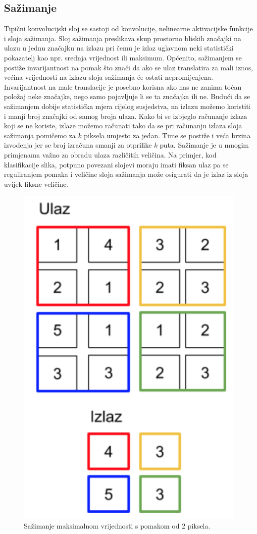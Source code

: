 \subsection{Sažimanje}
Tipični konvolucijski sloj se sastoji od konvolucije, nelinearne aktivacijske funkcije i sloja sažimanja. Sloj sažimanja preslikava skup prostorno bliskih značajki na ulazu u jednu značajku na izlazu pri čemu je izlaz uglavnom neki statistički pokazatelj kao npr. srednja vrijednost ili maksimum. Općenito, sažimanjem se postiže invarijantnost na pomak što znači da ako se ulaz translatira za mali iznos, većina vrijednosti na izlazu sloja sažimanja će ostati nepromijenjena. Invarijantnost na male translacije je posebno korisna ako nas ne zanima točan položaj neke značajke, nego samo pojavljuje li se ta značajka ili ne. Budući da se sažimanjem dobije statistička mjera cijelog susjedstva, na izlazu možemo koristiti i manji broj značajki od samog broja ulaza. Kako bi se izbjeglo računanje izlaza koji se ne koriste, izlaze možemo računati tako da se pri računanju izlaza sloja sažimanja pomičemo za $k$ piksela umjesto za jedan. Time se postiže i veća brzina izvođenja jer se broj izračuna smanji za otprilike $k$ puta. Sažimanje je u mnogim primjenama važno za obradu ulaza različitih veličina. Na primjer, kod klasifikacije slika, potpuno povezani slojevi moraju imati fiksan ulaz pa se reguliranjem pomaka i veličine sloja sažimanja može osigurati da je izlaz iz sloja uvijek fiksne veličine. 

 \begin{figure}
	\centering
	\includegraphics[scale=1]{img/sazimanje.png}
	\caption{Sažimanje maksimalnom vrijednosti s pomakom od 2 piksela.}
	\label{sazimanje}
\end{figure}